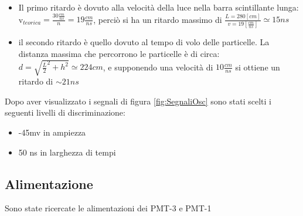 \documentclass[a4paper]{article}
\begin{document}
\begin{itemize}
\item Il primo ritardo è dovuto alla velocità della luce nella barra scintillante lunga: v$_{teorica} = \frac{30\frac{cm}{ns}}{n} = 19 \frac{cm}{ns}$, perciò si ha un ritardo massimo di $\frac{L = 280 [cm]}{v = 19 [\frac{cm}{ns}]} \simeq 15 ns$
\item il secondo ritardo è quello dovuto al tempo di volo delle particelle. La distanza massima che percorrono le particelle è di circa: $d = \sqrt{\frac{L}{2}^2 + h^2} \simeq 224 cm$, e supponendo una velocità di $10\frac{cm}{ns}$ si ottiene un ritardo di $\sim 21 ns$
\end{itemize}

Dopo aver visualizzato i segnali di figura \ref{fig:SegnaliOsc} sono stati scelti i seguenti livelli di discriminazione:

\begin{itemize}
\item -45mv in ampiezza
\item 50 ns in larghezza di tempi
\end{itemize}

\subsection{Alimentazione}
\label{sec:CalSin}
Sono state ricercate le alimentazioni dei PMT-3 e PMT-1
\end{document}
